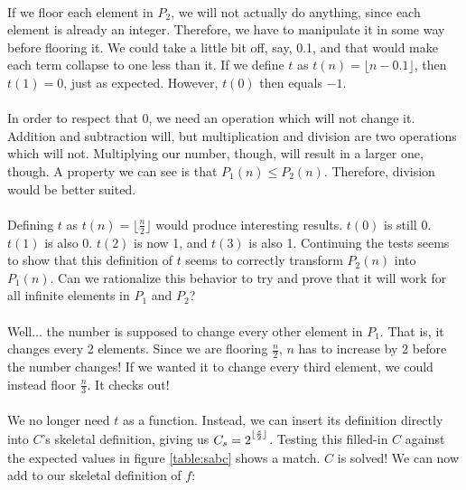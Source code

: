 \documentclass[12pt,letterpaper]{article}
\begin{document}
			\paragraph{} If we floor each element in $P_2$, we will not actually do anything, since each element is already an integer. Therefore, we have to manipulate it in some way before flooring it. We could take a little bit off, say, 0.1, and that would make each term collapse to one less than it. If we define $t$ as $t(n) = \lfloor n - 0.1 \rfloor$, then $t(1) = 0$, just as expected. However, $t(0)$ then equals $-1$.
			
			\paragraph{} In order to respect that 0, we need an operation which will not change it. Addition and subtraction will, but multiplication and division are two operations which will not. Multiplying our number, though, will result in a larger one, though. A property we can see is that $P_1(n) \leqslant P_2(n)$. Therefore, division would be better suited.
			
			\paragraph{} Defining $t$ as $t(n) = \lfloor \frac{n}{2} \rfloor$ would produce interesting results. $t(0)$ is still 0. $t(1)$ is also 0. $t(2)$ is now 1, and $t(3)$ is also 1. Continuing the tests seems to show that this definition of $t$ seems to correctly transform $P_2(n)$ into $P_1(n)$. Can we rationalize this behavior to try and prove that it will work for all infinite elements in $P_1$ and $P_2$?
			
			\paragraph{} Well... the number is supposed to change every other element in $P_1$. That is, it changes every 2 elements. Since we are flooring $\frac{n}{2}$, $n$ has to increase by 2 before the number changes! If we wanted it to change every third element, we could instead floor $\frac{n}{3}$. It checks out!
			
			\paragraph{} We no longer need $t$ as a function. Instead, we can insert its definition directly into $C$'s skeletal definition, giving us $C_s = 2\strut^{\lfloor \frac{s}{2} \rfloor}$. Testing this filled-in $C$ against the expected values in figure \ref{table:sabc} shows a match. $C$ is solved! We can now add to our skeletal definition of $f$:
			
\end{document}
